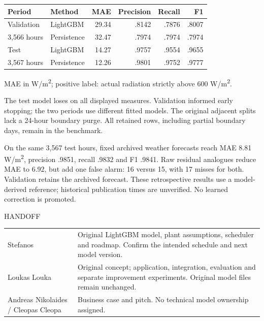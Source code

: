 \documentclass[10pt,a4paper]{article}
\newcommand{\titleline}[2]{{\small\color{teal} #1}\par\vspace{3mm}{\fontsize{29}{33}\selectfont\bfseries #2}\par\vspace{4mm}}
\newcommand{\smallhead}[1]{\vspace{3mm}{\large\bfseries #1}\par}
\begin{document}
\smallhead{Original forecast: full retained periods}
\begin{center}
\begin{tabular}{@{}llrrrr@{}}\toprule
Period & Method & MAE & Precision & Recall & F1 \\\midrule
Validation & LightGBM & 29.34 & .8142 & .7876 & .8007 \\
3,566 hours & Persistence & 32.47 & .7974 & .7974 & .7974 \\
Test & LightGBM & 14.27 & .9757 & .9554 & .9655 \\
3,567 hours & Persistence & 12.26 & .9801 & .9752 & .9777 \\\bottomrule
\end{tabular}
\par{\small\color{muted} MAE in W/m\textsuperscript{2}; positive label: actual radiation strictly above 600 W/m\textsuperscript{2}.}
\end{center}
The test model loses on all displayed measures. Validation informed early stopping; the two periods use different fitted models. The original adjacent splits lack a 24-hour boundary purge. All retained rows, including partial boundary days, remain in the benchmark.

\smallhead{Archived weather and residual corrections}
On the same 3,567 test hours, fixed archived weather forecasts reach MAE 8.81 W/m\textsuperscript{2}, precision .9851, recall .9832 and F1 .9841. Raw residual analogues reduce MAE to 6.92, but add one false alarm: 16 versus 15, with 17 misses for both. Validation retains the archived forecast. These retrospective results use a model-derived reference; historical publication times are unverified. No learned correction is promoted.

\newpage
\titleline{HANDOFF}{Keep ownership and evidence clear.}
\smallhead{Roles}
\begin{center}
\begin{tabular}{@{}>{\raggedright\arraybackslash}p{.26\linewidth}>{\raggedright\arraybackslash}p{.67\linewidth}@{}}\toprule
Stefanos & Original LightGBM model, plant assumptions, scheduler and roadmap. Confirm the intended schedule and next model version. \\
Loukas Louka & Original concept; application, integration, evaluation and separate improvement experiments. Original model files remain unchanged. \\
Andreas Nikolaides / Cleopas Cleopa & Business case and pitch. No technical model ownership assigned. \\\bottomrule
\end{tabular}
\end{center}
\end{document}
